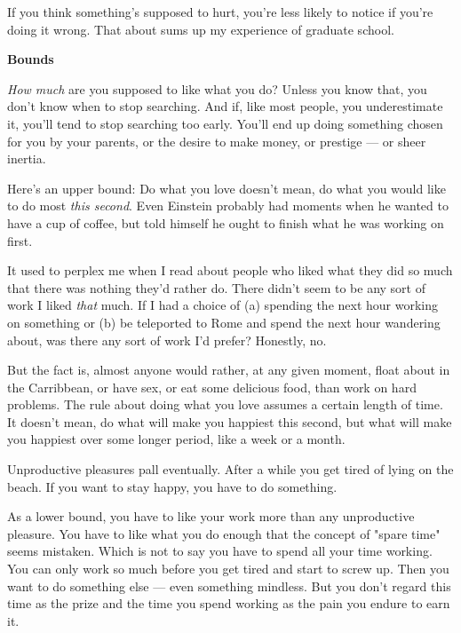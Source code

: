 If you
                    think something's supposed to hurt, you're less likely to
                    notice if you're doing it wrong. That about sums up my
                    experience of graduate school.

\textbf{Bounds}

\emph{How much} are you supposed to like what
                    you do? Unless you know that, you don't know when to stop
                    searching. And if, like most people, you underestimate it,
                    you'll tend to stop searching too early. You'll end up doing
                    something chosen for you by your parents, or the desire to
                    make money, or prestige --- or sheer inertia.

Here's
                    an upper bound: Do what you love doesn't mean, do what you
                    would like to do most \emph{this second}. Even Einstein
                    probably had moments when he wanted to have a cup of coffee,
                    but told himself he ought to finish what he was working on
                    first.

It used to perplex me when I read about
                    people who liked what they did so much that there was
                    nothing they'd rather do. There didn't seem to be any sort
                    of work I liked \emph{that} much. If I had a choice of (a)
                    spending the next hour working on something or (b) be
                    teleported to Rome and spend the next hour wandering about,
                    was there any sort of work I'd prefer? Honestly, no.

But
                    the fact is, almost anyone would rather, at any given
                    moment, float about in the Carribbean, or have sex, or eat
                    some delicious food, than work on hard problems. The rule
                    about doing what you love assumes a certain length of time.
                    It doesn't mean, do what will make you happiest this second,
                    but what will make you happiest over some longer period,
                    like a week or a month.

Unproductive pleasures
                    pall eventually. After a while you get tired of lying on the
                    beach. If you want to stay happy, you have to do
                    something.

As a lower bound, you have to like
                    your work more than any unproductive pleasure. You have to
                    like what you do enough that the concept of "spare time"
                    seems mistaken. Which is not to say you have to spend all
                    your time working. You can only work so much before you get
                    tired and start to screw up. Then you want to do something
                    else --- even something mindless. But you don't regard
                    this time as the prize and the time you spend working as the
                    pain you endure to earn it.

